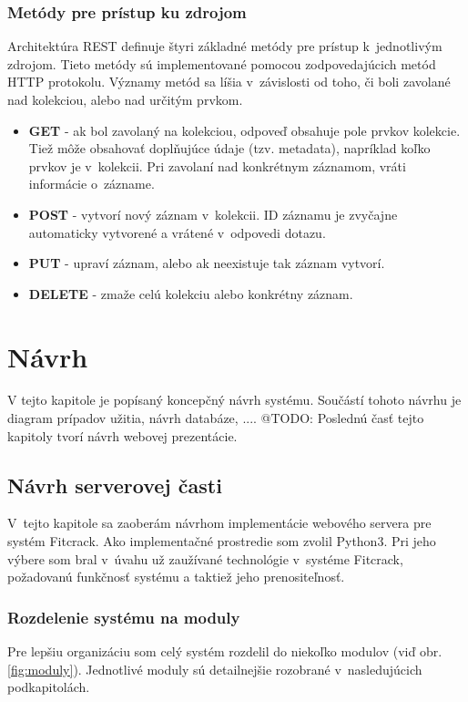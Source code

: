 \documentclass[slovak]{fitthesis}
\begin{document}
\subsection{Metódy pre prístup ku zdrojom}\label{httpMetody}
Architektúra REST definuje štyri základné metódy pre prístup k~jednotlivým zdrojom. Tieto metódy sú implementované pomocou zodpovedajúcich metód HTTP protokolu. Významy metód sa líšia v~závislosti od toho, či boli zavolané nad kolekciou, alebo nad určitým prvkom.
\begin{itemize}
    \item \textbf{GET} - ak bol zavolaný na kolekciou, odpoveď obsahuje pole prvkov kolekcie. Tiež môže obsahovať doplňujúce údaje (tzv. metadata), napríklad koľko prvkov je v~kolekcii.
    Pri zavolaní nad konkrétnym záznamom, vráti informácie o~zázname.
    \item \textbf{POST} - vytvorí nový záznam v~kolekcii. ID záznamu je zvyčajne automaticky vytvorené a vrátené v~odpovedi dotazu.
    \item \textbf{PUT} - upraví záznam, alebo ak neexistuje tak záznam vytvorí.
    \item \textbf{DELETE} - zmaže celú kolekciu alebo konkrétny záznam.
\end{itemize}



\chapter{Návrh}\label{navrh}
V tejto kapitole je popísaný koncepčný návrh systému. Součástí tohoto návrhu je
diagram prípadov užitia, návrh databáze, ....
@TODO:
Poslednú časť tejto kapitoly tvorí návrh webovej prezentácie.


\section{Návrh serverovej časti}\label{navrhServer}
V~tejto kapitole sa zaoberám návrhom implementácie webového servera pre systém Fitcrack. Ako implementačné prostredie som zvolil Python3. Pri jeho výbere som bral v~úvahu už zaužívané technológie v~systéme Fitcrack, požadovanú funkčnosť systému a taktiež jeho prenositeľnosť.

\subsection{Rozdelenie systému na moduly}
Pre lepšiu organizáciu som celý systém rozdelil do niekoľko modulov (viď obr. \ref{fig:moduly}). Jednotlivé moduly sú detailnejšie rozobrané v~nasledujúcich podkapitolách. 
\end{document}
